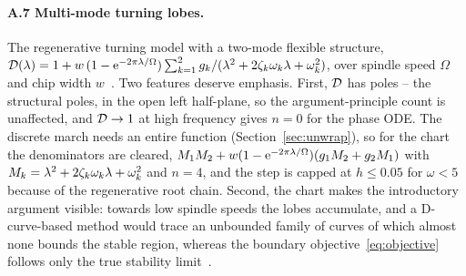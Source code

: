 \paragraph{A.7 Multi-mode turning lobes.}
The regenerative turning model with a two-mode flexible structure,
$\mathcal{D}(\lambda)=1+w\,(1-\mathrm{e}^{-2\pi\lambda/\Omega})\sum_{k=1}^{2}
g_k/(\lambda^2+2\zeta_k\omega_k\lambda+\omega_k^2)$, over spindle speed $\Omega$
and chip width $w$~\cite{tobias1958theory,altintas1995analytical,stepan2001modelling}.
Two features deserve emphasis. First, $\mathcal{D}$ has poles -- the structural
poles, in the open left half-plane, so the argument-principle count is
unaffected, and $\mathcal{D}\to1$ at high frequency gives $n=0$ for the phase ODE.
The discrete march needs an entire function (Section~\ref{sec:unwrap}), so
for the chart the denominators are cleared,
$M_1M_2+w(1-\mathrm{e}^{-2\pi\lambda/\Omega})(g_1M_2+g_2M_1)$ with
$M_k=\lambda^2+2\zeta_k\omega_k\lambda+\omega_k^2$ and $n=4$, and the step is capped
at $h\le0.05$ for $\omega<5$ because of the regenerative root chain. Second, the
chart makes the introductory argument visible: towards low spindle speeds
the lobes accumulate, and a D-curve-based method would trace an unbounded
family of curves of which almost none bounds the stable region, whereas the
boundary objective~\eqref{eq:objective} follows only the true stability
limit~\cite{bachrathy2013improved}.

